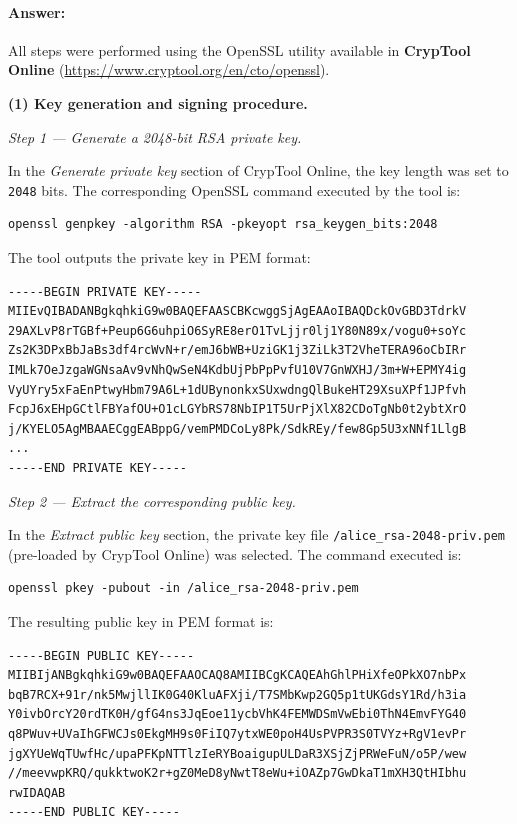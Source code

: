 \documentclass[]{scrartcl}
\begin{document}
\paragraph{Answer:}{

All steps were performed using the OpenSSL utility available in
\textbf{CrypTool Online} (\url{https://www.cryptool.org/en/cto/openssl}).

\medskip
\textbf{(1) Key generation and signing procedure.}

\medskip
\textit{Step 1 --- Generate a 2048-bit RSA private key.}

In the \emph{Generate private key} section of CrypTool Online, the key length
was set to \texttt{2048} bits.
The corresponding OpenSSL command executed by the tool is:

\begin{lstlisting}[style=plusStyle]
openssl genpkey -algorithm RSA -pkeyopt rsa_keygen_bits:2048
\end{lstlisting}

The tool outputs the private key in PEM format:

\begin{lstlisting}[style=plusStyle, basicstyle=\tiny\ttfamily]
-----BEGIN PRIVATE KEY-----
MIIEvQIBADANBgkqhkiG9w0BAQEFAASCBKcwggSjAgEAAoIBAQDckOvGBD3TdrkV
29AXLvP8rTGBf+Peup6G6uhpiO6SyRE8erO1TvLjjr0lj1Y80N89x/vogu0+soYc
Zs2K3DPxBbJaBs3df4rcWvN+r/emJ6bWB+UziGK1j3ZiLk3T2VheTERA96oCbIRr
IMLk7OeJzgaWGNsaAv9vNhQwSeN4KdbUjPbPpPvfU10V7GnWXHJ/3m+W+EPMY4ig
VyUYry5xFaEnPtwyHbm79A6L+1dUBynonkxSUxwdngQlBukeHT29XsuXPf1JPfvh
FcpJ6xEHpGCtlFBYafOU+O1cLGYbRS78NbIP1T5UrPjXlX82CDoTgNb0t2ybtXrO
j/KYELO5AgMBAAECggEABppG/vemPMDCoLy8Pk/SdkREy/few8Gp5U3xNNf1LlgB
...
-----END PRIVATE KEY-----
\end{lstlisting}

\medskip
\textit{Step 2 --- Extract the corresponding public key.}

In the \emph{Extract public key} section, the private key file
\texttt{/alice\_rsa-2048-priv.pem} (pre-loaded by CrypTool Online) was selected.
The command executed is:

\begin{lstlisting}[style=plusStyle]
openssl pkey -pubout -in /alice_rsa-2048-priv.pem
\end{lstlisting}

The resulting public key in PEM format is:

\begin{lstlisting}[style=plusStyle, basicstyle=\tiny\ttfamily]
-----BEGIN PUBLIC KEY-----
MIIBIjANBgkqhkiG9w0BAQEFAAOCAQ8AMIIBCgKCAQEAhGhlPHiXfeOPkXO7nbPx
bqB7RCX+91r/nk5MwjllIK0G40KluAFXji/T7SMbKwp2GQ5p1tUKGdsY1Rd/h3ia
Y0ivbOrcY20rdTK0H/gfG4ns3JqEoe11ycbVhK4FEMWDSmVwEbi0ThN4EmvFYG40
q8PWuv+UVaIhGFWCJs0EkgMH9s0FiIQ7ytxWE0poH4UsPVPR3S0TVYz+RgV1evPr
jgXYUeWqTUwfHc/upaPFKpNTTlzIeRYBoaigupULDaR3XSjZjPRWeFuN/o5P/wew
//meevwpKRQ/qukktwoK2r+gZ0MeD8yNwtT8eWu+iOAZp7GwDkaT1mXH3QtHIbhu
rwIDAQAB
-----END PUBLIC KEY-----
\end{lstlisting}

}
\end{document}
